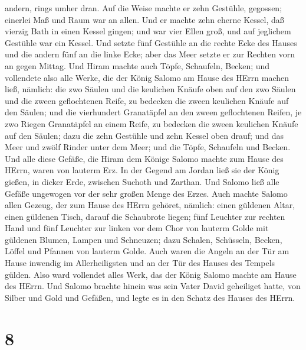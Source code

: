andern, rings umher dran.  Auf die Weise machte er zehn
Gestühle, gegossen; einerlei Maß und Raum war an allen. 
Und er machte zehn eherne Kessel, daß vierzig Bath in einen Kessel
gingen; und war vier Ellen groß, und auf jeglichem Gestühle war ein
Kessel.  Und setzte fünf Gestühle an die rechte Ecke des
Hauses und die andern fünf an die linke Ecke; aber das Meer setzte er
zur Rechten vorn an gegen Mittag.  Und Hiram machte auch
Töpfe, Schaufeln, Becken; und vollendete also alle Werke, die der König
Salomo am Hause des HErrn machen ließ,  nämlich: die zwo
Säulen und die keulichen Knäufe oben auf den zwo Säulen und die zween
geflochtenen Reife, zu bedecken die zween keulichen Knäufe auf den
Säulen;  und die vierhundert Granatäpfel an den zween
geflochtenen Reifen, je zwo Riegen Granatäpfel an einem Reife, zu
bedecken die zween keulichen Knäufe auf den Säulen;  dazu
die zehn Gestühle und zehn Kessel oben drauf;  und das Meer
und zwölf Rinder unter dem Meer;  und die Töpfe, Schaufeln
und Becken. Und alle diese Gefäße, die Hiram dem Könige Salomo machte
zum Hause des HErrn, waren von lauterm Erz.  In der Gegend
am Jordan ließ sie der König gießen, in dicker Erde, zwischen Suchoth
und Zarthan.  Und Salomo ließ alle Gefäße ungewogen vor der
sehr großen Menge des Erzes.  Auch machte Salomo allen
Gezeug, der zum Hause des HErrn gehöret, nämlich: einen güldenen Altar,
einen güldenen Tisch, darauf die Schaubrote liegen;  fünf
Leuchter zur rechten Hand und fünf Leuchter zur linken vor dem Chor von
lauterm Golde mit güldenen Blumen, Lampen und Schneuzen; 
dazu Schalen, Schüsseln, Becken, Löffel und Pfannen von lauterm Golde.
Auch waren die Angeln an der Tür am Hause inwendig im Allerheiligsten
und an der Tür des Hauses des Tempels gülden.  Also ward
vollendet alles Werk, das der König Salomo machte am Hause des HErrn.
Und Salomo brachte hinein was sein Vater David geheiliget hatte, von
Silber und Gold und Gefäßen, und legte es in den Schatz des Hauses des
HErrn.

\hypertarget{section-7}{%
\section{8}\label{section-7}}

